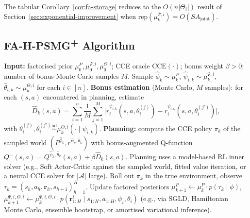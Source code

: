 The tabular Corollary~\ref{cor:fa-storage} reduces to the $O(n |\Theta_i|)$ result of Section~\ref{sec:exponential-improvement} when $\mathrm{rep}(\mu_k^{\Psi, i}) = O(S A_{\mathrm{joint}})$.

\subsection{FA-H-PSMG\textsuperscript{+} Algorithm}
\label{app:fa-algorithm}

\begin{algorithm}[ht]
\caption{FA-H-PSMG\textsuperscript{+}: function-approximation H-PSMG\textsuperscript{+}}
\label{alg:fa-hpsmg-plus}
\begin{algorithmic}[1]
\STATE \textbf{Input:} factorised prior $\mu_0^P, \mu_0^{\Psi, i}, \mu_0^{\Theta, i}$; CCE oracle $\mathrm{CCE}(\cdot)$; bonus weight $\beta > 0$; number of bonus Monte Carlo samples $M$.
  \STATE Sample $\hat\phi_k \sim \mu_k^P$, $\hat\psi_{i,k} \sim \mu_k^{\Psi, i}$, $\hat\theta_{i,k} \sim \mu_k^{\Theta, i}$ for each $i \in [n]$.
  \STATE \textbf{Bonus estimation} (Monte Carlo, $M$ samples): for each $(s, a)$ encountered in planning, estimate
  \begin{equation*}
  \widehat{D}_k(s, a) = \sum_{i=1}^n \frac{1}{M} \sum_{j=1}^M \big|r_i^{\psi_{i,k}}(s, a, \theta_i^{(j)}) - r_i^{\psi_{i,k}}(s, a, \theta_i^{(j')})\big|,
  \end{equation*}
  with $\theta_i^{(j)}, \theta_i^{(j')} \stackrel{\mathrm{iid}}{\sim} \mu_k^{\Theta, i}(\cdot \mid \psi_{i,k})$.
  \STATE \textbf{Planning:} compute the CCE policy $\pi_k$ of the sampled world $(P^{\hat\phi_k}, r^{\hat\psi_k, \hat\theta_k})$ with bonus-augmented Q-function $Q^+(s, a) = Q^{\hat\psi_k, \hat\theta_k}(s, a) + \beta \widehat{D}_k(s, a)$. Planning uses a model-based RL inner solver (e.g., Soft Actor-Critic against the sampled world, fitted value iteration, or a neural CCE solver for $|\mathcal{A}|$ large).
  \STATE Roll out $\pi_k$ in the true environment, observe $\tau_k = (s_h, a_h, \boldsymbol{r}_h, s_{h+1})_{h=1}^H$.
  \STATE Update factored posteriors $\mu_{k+1}^P \leftarrow \mu_k^P \cdot p(\tau_k \mid \phi)$, $\mu_{k+1}^{\Psi, i, \Theta, i} \leftarrow \mu_k^{\Psi, i, \Theta, i} \cdot p(\boldsymbol{r}^i_{1:H} \mid s_{1:H}, a_{1:H}, \psi_i, \theta_i)$ (e.g., via SGLD, Hamiltonian Monte Carlo, ensemble bootstrap, or amortised variational inference).
\ENDFOR
\end{algorithmic}
\end{algorithm}

